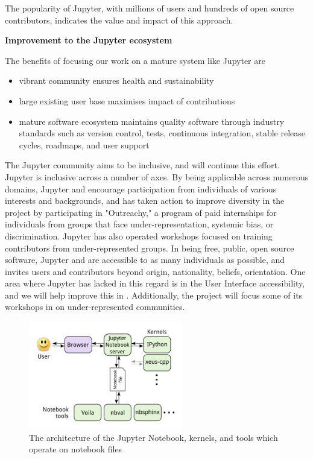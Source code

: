 The popularity of Jupyter, with millions of users and hundreds of open
source contributors, indicates the value and impact of this approach.

\medskip
\textbf{Improvement to the Jupyter ecosystem}

The benefits of focusing our work on a mature system like Jupyter are

\begin{itemize}
\item vibrant community ensures health and sustainability
\item large existing user base maximises impact of contributions
\item mature software ecosystem maintains quality software through
  industry standards such as version control, tests, continuous
  integration, stable release cycles, roadmaps, and user support
\end{itemize}

The Jupyter community aims to be inclusive, and \TheProject will
continue this effort.  Jupyter is inclusive across a number of axes.
By being applicable across numerous domains, Jupyter and \TheProject
encourage participation from individuals of various interests and
backgrounds, and has taken action to improve diversity in the project
by participating in "Outreachy," a program of paid internships for
individuals from groups that face under-representation, systemic bias,
or discrimination.  Jupyter has also operated workshops focused on
training contributors from under-represented groups.  In being free,
public, open source software, Jupyter and \TheProject are accessible
to as many individuals as possible, and invites users and contributors
beyond origin, nationality, beliefs, orientation.  One area where
Jupyter has lacked in this regard is in the User Interface
accessibility, and we will help improve this in
.  Additionally, the project will
focus some of its workshops in  on
under-represented communities.


\begin{figure}[ht!]\centering
  \includegraphics[width=0.6\textwidth]{images/notebook_components.png}
  \caption{The architecture of the Jupyter Notebook, kernels, and tools
        which operate on notebook files}
  \label{fig:notebook-architecture}
\end{figure}

